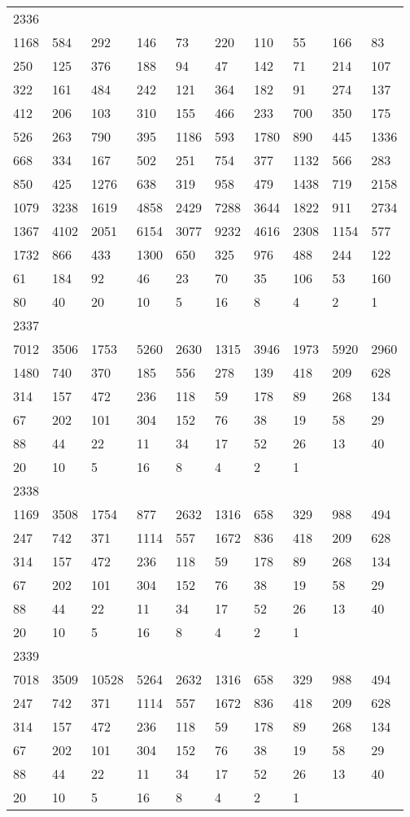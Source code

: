 \begin{longtable}{*{10}{l}}
2336&&&&&&&&&\\
1168& 584& 292& 146& 73& 220& 110& 55& 166& 83\\
250& 125& 376& 188& 94& 47& 142& 71& 214& 107\\
322& 161& 484& 242& 121& 364& 182& 91& 274& 137\\
412& 206& 103& 310& 155& 466& 233& 700& 350& 175\\
526& 263& 790& 395& 1186& 593& 1780& 890& 445& 1336\\
668& 334& 167& 502& 251& 754& 377& 1132& 566& 283\\
850& 425& 1276& 638& 319& 958& 479& 1438& 719& 2158\\
1079& 3238& 1619& 4858& 2429& 7288& 3644& 1822& 911& 2734\\
1367& 4102& 2051& 6154& 3077& 9232& 4616& 2308& 1154& 577\\
1732& 866& 433& 1300& 650& 325& 976& 488& 244& 122\\
61& 184& 92& 46& 23& 70& 35& 106& 53& 160\\
80& 40& 20& 10& 5& 16& 8& 4& 2& 1\\

2337&&&&&&&&&\\
7012& 3506& 1753& 5260& 2630& 1315& 3946& 1973& 5920& 2960\\
1480& 740& 370& 185& 556& 278& 139& 418& 209& 628\\
314& 157& 472& 236& 118& 59& 178& 89& 268& 134\\
67& 202& 101& 304& 152& 76& 38& 19& 58& 29\\
88& 44& 22& 11& 34& 17& 52& 26& 13& 40\\
20& 10& 5& 16& 8& 4& 2& 1& \\

2338&&&&&&&&&\\
1169& 3508& 1754& 877& 2632& 1316& 658& 329& 988& 494\\
247& 742& 371& 1114& 557& 1672& 836& 418& 209& 628\\
314& 157& 472& 236& 118& 59& 178& 89& 268& 134\\
67& 202& 101& 304& 152& 76& 38& 19& 58& 29\\
88& 44& 22& 11& 34& 17& 52& 26& 13& 40\\
20& 10& 5& 16& 8& 4& 2& 1& \\

2339&&&&&&&&&\\
7018& 3509& 10528& 5264& 2632& 1316& 658& 329& 988& 494\\
247& 742& 371& 1114& 557& 1672& 836& 418& 209& 628\\
314& 157& 472& 236& 118& 59& 178& 89& 268& 134\\
67& 202& 101& 304& 152& 76& 38& 19& 58& 29\\
88& 44& 22& 11& 34& 17& 52& 26& 13& 40\\
20& 10& 5& 16& 8& 4& 2& 1& \\


\end{longtable}

